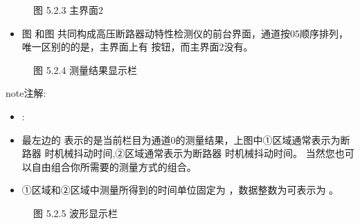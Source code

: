 \documentclass[a4paper,10pt,english]{sphinxmanual}
\begin{document}
\begin{figure}[htbp]
\centering
\capstart

\noindent{}
\caption{图 5.2.3 主界面2}\label{\detokenize{operation_guide:id11}}\end{figure}
\begin{itemize}
\item {} 
\sphinxAtStartPar
图  和图  共同构成高压断路器动特性检测仪的前台界面，通道按0\sphinxhyphen{}5顺序排列，唯一区别的的是，主界面上有  按钮，而主界面2没有。

\end{itemize}

\begin{figure}[htbp]
\centering
\capstart

\noindent{}
\caption{图 5.2.4 测量结果显示栏}\label{\detokenize{operation_guide:id12}}\end{figure}

\begin{sphinxadmonition}{note}{注解:}\begin{itemize}
\item {} 
\sphinxAtStartPar
{} :

\item {} 
\sphinxAtStartPar
最左边的  表示的是当前栏目为通道0的测量结果，上图中①区域通常表示为断路器  时机械抖动时间,②区域通常表示为断路器  时机械抖动时间。
当然您也可以自由组合你所需要的测量方式的组合。

\item {} 
\sphinxAtStartPar
①区域和②区域中测量所得到的时间单位固定为 ，数据整数为可表示为 。

\end{itemize}
\end{sphinxadmonition}

\begin{figure}[htbp]
\centering
\capstart

\noindent{}
\caption{图 5.2.5 波形显示栏}\label{\detokenize{operation_guide:id13}}\end{figure}
\end{document}
